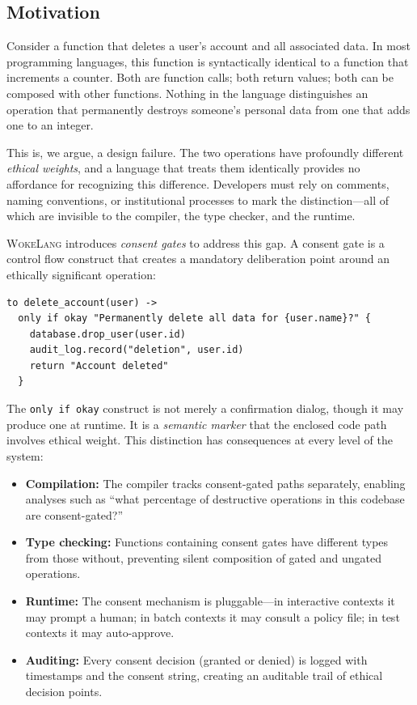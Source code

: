 \documentclass[11pt,a4paper]{article}
\newcommand{\WokeLang}{\textsc{WokeLang}}
\begin{document}
\subsection{Motivation}

Consider a function that deletes a user's account and all associated
data.  In most programming languages, this function is syntactically
identical to a function that increments a counter.  Both are function
calls; both return values; both can be composed with other functions.
Nothing in the language distinguishes an operation that permanently
destroys someone's personal data from one that adds one to an integer.

This is, we argue, a design failure.  The two operations have
profoundly different \emph{ethical weights}, and a language that treats
them identically provides no affordance for recognizing this
difference.  Developers must rely on comments, naming conventions, or
institutional processes to mark the distinction---all of which are
invisible to the compiler, the type checker, and the runtime.

\WokeLang{} introduces \emph{consent gates} to address this gap.  A
consent gate is a control flow construct that creates a mandatory
deliberation point around an ethically significant operation:

\begin{lstlisting}[caption={Consent gate for account deletion}]
to delete_account(user) ->
  only if okay "Permanently delete all data for {user.name}?" {
    database.drop_user(user.id)
    audit_log.record("deletion", user.id)
    return "Account deleted"
  }
\end{lstlisting}

The \texttt{only if okay} construct is not merely a confirmation
dialog, though it may produce one at runtime.  It is a
\emph{semantic marker} that the enclosed code path involves ethical
weight.  This distinction has consequences at every level of the
system:

\begin{itemize}[leftmargin=*]
  \item \textbf{Compilation:} The compiler tracks consent-gated paths
    separately, enabling analyses such as ``what percentage of
    destructive operations in this codebase are consent-gated?''

  \item \textbf{Type checking:} Functions containing consent gates
    have different types from those without, preventing silent
    composition of gated and ungated operations.

  \item \textbf{Runtime:} The consent mechanism is pluggable---in
    interactive contexts it may prompt a human; in batch contexts it
    may consult a policy file; in test contexts it may auto-approve.

  \item \textbf{Auditing:} Every consent decision (granted or denied)
    is logged with timestamps and the consent string, creating an
    auditable trail of ethical decision points.
\end{itemize}
\end{document}
